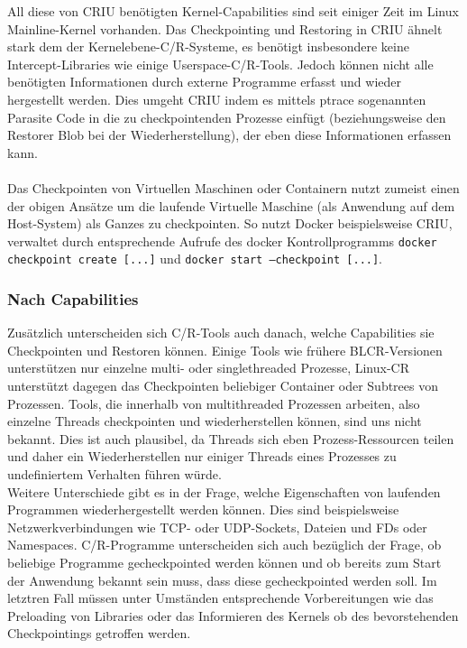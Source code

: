 \documentclass[a4paper]{article}
\begin{document}
All diese von CRIU benötigten Kernel-Capabilities sind seit einiger Zeit im Linux Mainline-Kernel vorhanden.
Das Checkpointing und Restoring in CRIU ähnelt stark dem der Kernelebene-C/R-Systeme, es benötigt insbesondere keine Intercept-Libraries wie einige Userspace-C/R-Tools. 
Jedoch können nicht alle benötigten Informationen durch externe Programme erfasst und wieder hergestellt werden. 
Dies umgeht CRIU indem es mittels ptrace sogenannten Parasite Code in die zu checkpointenden Prozesse einfügt (beziehungsweise den Restorer Blob bei der Wiederherstellung), der eben diese Informationen erfassen kann.\\ \\
Das Checkpointen von Virtuellen Maschinen oder Containern nutzt zumeist einen der obigen Ansätze um die laufende Virtuelle Maschine (als Anwendung auf dem Host-System) als Ganzes zu checkpointen. 
So nutzt Docker beispielsweise CRIU, verwaltet durch entsprechende Aufrufe des docker Kontrollprogramms \texttt{docker checkpoint create [...]} und \texttt{docker start --checkpoint [...]}.

\subsubsection{Nach Capabilities}
Zusätzlich unterscheiden sich C/R-Tools auch danach, welche Capabilities sie Checkpointen und Restoren können. 
Einige Tools wie frühere BLCR-Versionen unterstützen nur einzelne multi- oder singlethreaded Prozesse, Linux-CR unterstützt dagegen das Checkpointen beliebiger Container oder Subtrees von Prozessen.
Tools, die innerhalb von multithreaded Prozessen arbeiten, also einzelne Threads checkpointen und wiederherstellen können, sind uns nicht bekannt. 
Dies ist auch plausibel, da Threads sich eben Prozess-Ressourcen teilen und daher ein Wiederherstellen nur einiger Threads eines Prozesses zu undefiniertem Verhalten führen würde.\\
Weitere Unterschiede gibt es in der Frage, welche Eigenschaften von laufenden Programmen wiederhergestellt werden können. Dies sind beispielsweise Netzwerkverbindungen wie TCP- oder UDP-Sockets, Dateien und FDs oder Namespaces. C/R-Programme unterscheiden sich auch bezüglich der Frage, ob beliebige Programme gecheckpointed werden können und ob bereits zum Start der Anwendung bekannt sein muss, dass diese gecheckpointed werden soll. Im letztren Fall müssen unter Umständen entsprechende Vorbereitungen wie das Preloading von Libraries oder das Informieren des Kernels ob des bevorstehenden Checkpointings getroffen werden.
\end{document}
